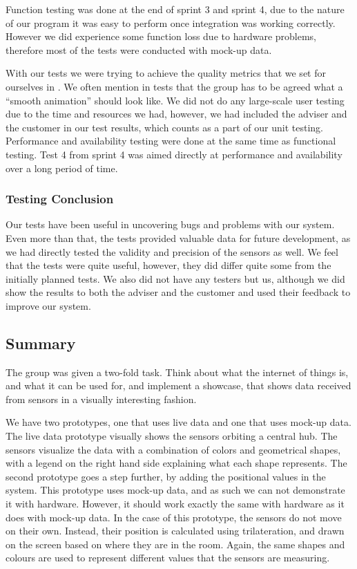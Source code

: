 \documentclass[../document]{subfiles}
\begin{document}
Function testing was done at the end of sprint 3 and sprint 4, due to the nature of our program it was easy to perform once integration was working correctly. However we did experience some function loss due to hardware problems, therefore most of the tests were conducted with mock-up data.

With our tests we were trying to achieve the quality metrics that we set for ourselves in . We often mention in tests that the group has to be agreed what a “smooth animation” should look like. We did not do any large-scale user testing due to the time and resources we had, however, we had included the adviser and the customer in our test results, which counts as a part of our unit testing. Performance and availability testing were done at the same time as functional testing. Test 4 from sprint 4 was aimed directly at performance and availability over a long period of time. 

\subsubsection{Testing Conclusion}
Our tests have been useful in uncovering bugs and problems with our system. Even more than that, the tests provided valuable data for future development, as we had directly tested the validity and precision of the sensors as well. We feel that the tests were quite useful, however, they did differ quite some from the initially planned tests. We also did not have any testers but us, although we did show the results to both the adviser and the customer and used their feedback to improve our system. 

\subsection{Summary}
The group was given a two-fold task. Think about what the internet of things is, and what it can be used for, and implement a showcase, that shows data received from sensors in a visually interesting fashion.

We have two prototypes, one that uses live data and one that uses mock-up data. The live data prototype visually shows the sensors orbiting a central hub. The sensors visualize the data with a combination of colors and geometrical shapes, with a legend on the right hand side explaining what each shape represents. The second prototype goes a step further, by adding the positional values in the system. This prototype uses mock-up data, and as such we can not demonstrate it with hardware. However, it should work exactly the same with hardware as it does with mock-up data. In the case of this prototype, the sensors do not move on their own. Instead, their position is calculated using trilateration, and drawn on the screen based on where they are in the room. Again, the same shapes and colours are used to represent different values that the sensors are measuring.
\end{document}
